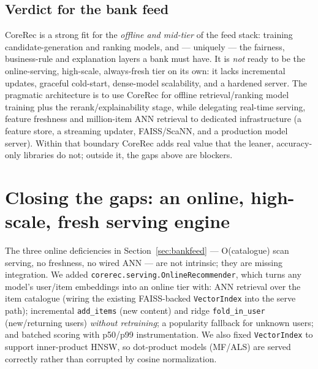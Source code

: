 \documentclass[10pt]{article}
\begin{document}
\subsection*{Verdict for the bank feed}
CoreRec is a strong fit for the \emph{offline and mid-tier} of the feed stack:
training candidate-generation and ranking models, and --- uniquely --- the
fairness, business-rule and explanation layers a bank must have. It is \emph{not}
ready to be the online-serving, high-scale, always-fresh tier on its own: it lacks
incremental updates, graceful cold-start, dense-model scalability, and a hardened
server. The pragmatic architecture is to use CoreRec for offline retrieval/ranking
model training plus the rerank/explainability stage, while delegating real-time
serving, feature freshness and million-item ANN retrieval to dedicated
infrastructure (a feature store, a streaming updater, FAISS/ScaNN, and a
production model server). Within that boundary CoreRec adds real value that the
leaner, accuracy-only libraries do not; outside it, the gaps above are blockers.

\section{Closing the gaps: an online, high-scale, fresh serving engine}
\label{sec:online}
The three online deficiencies in Section~\ref{sec:bankfeed} --- O(catalogue) scan
serving, no freshness, no wired ANN --- are not intrinsic; they are missing
integration. We added \texttt{corerec.serving.OnlineRecommender}, which turns any
model's user/item embeddings into an online tier with: ANN retrieval over the item
catalogue (wiring the existing FAISS-backed \texttt{VectorIndex} into the serve
path); incremental \texttt{add\_items} (new content) and ridge \texttt{fold\_in\_user}
(new/returning users) \emph{without retraining}; a popularity fallback for unknown
users; and batched scoring with p50/p99 instrumentation. We also fixed
\texttt{VectorIndex} to support inner-product HNSW, so dot-product models (MF/ALS)
are served correctly rather than corrupted by cosine normalization.
\end{document}
